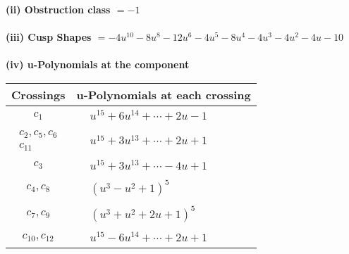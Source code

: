 \documentclass[1p]{elsarticle_modified}
\theoremstyle{definition}
\begin{document}
\flushleft \textbf{(ii) Obstruction class $= -1$}\\~\\
\flushleft \textbf{(iii) Cusp Shapes $= -4 u^{10}-8 u^8-12 u^6-4 u^5-8 u^4-4 u^3-4 u^2-4 u-10$}\\~\\
\newpage\renewcommand{\arraystretch}{1}
\flushleft \textbf{(iv) u-Polynomials at the component}\newline \\
\begin{tabular}{m{50pt}|m{274pt}}
Crossings & \hspace{64pt}u-Polynomials at each crossing \\
\hline $$\begin{aligned}c_{1}\end{aligned}$$&$\begin{aligned}
&u^{15}+6 u^{14}+\cdots+2 u-1
\end{aligned}$\\
\hline $$\begin{aligned}c_{2},c_{5},c_{6}\\c_{11}\end{aligned}$$&$\begin{aligned}
&u^{15}+3 u^{13}+\cdots+2 u+1
\end{aligned}$\\
\hline $$\begin{aligned}c_{3}\end{aligned}$$&$\begin{aligned}
&u^{15}+3 u^{13}+\cdots-4 u+1
\end{aligned}$\\
\hline $$\begin{aligned}c_{4},c_{8}\end{aligned}$$&$\begin{aligned}
&(u^3- u^2+1)^5
\end{aligned}$\\
\hline $$\begin{aligned}c_{7},c_{9}\end{aligned}$$&$\begin{aligned}
&(u^3+u^2+2 u+1)^5
\end{aligned}$\\
\hline $$\begin{aligned}c_{10},c_{12}\end{aligned}$$&$\begin{aligned}
&u^{15}-6 u^{14}+\cdots+2 u+1
\end{aligned}$\\
\hline
\end{tabular}\\~\\
\end{document}
